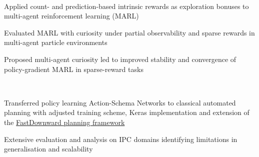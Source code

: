 \documentclass[]{lukas-cv-openfont}
\begin{document}
\noindent
{}
\\
\begin{tightitemize}{1.7em}
    \item Applied count- and prediction-based intrinsic rewards as exploration bonuses to multi-agent reinforcement learning (MARL)
    \item Evaluated MARL with curiosity under partial observability and sparse rewards in multi-agent particle environments
    \item Proposed multi-agent curiosity led to improved stability and convergence of policy-gradient MARL in sparse-reward tasks
\end{tightitemize}
\largesectionsep


\noindent
{}
\\
\begin{tightitemize}{1.7em}
    \item Transferred policy learning Action-Schema Networks to classical automated planning with adjusted training scheme, Keras implementation and extension of the \href{http://www.fast-downward.org}{FastDownward planning framework}
    \item Extensive evaluation and analysis on IPC domains identifying limitations in generalisation and scalability
\end{tightitemize}
\largesectionsep
\end{document}
